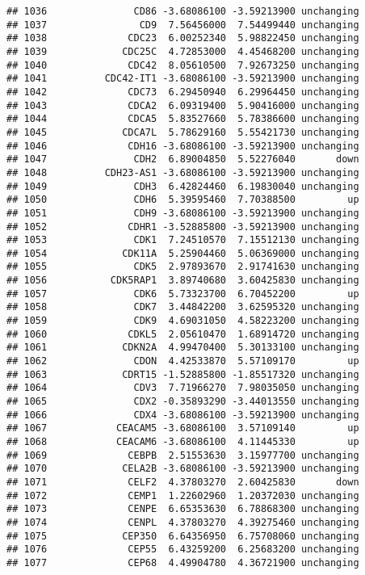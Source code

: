 \documentclass[]{article}
\begin{document}
\begin{verbatim}
## 1036               CD86 -3.68086100 -3.59213900 unchanging
## 1037                CD9  7.56456000  7.54499440 unchanging
## 1038              CDC23  6.00252340  5.98822450 unchanging
## 1039             CDC25C  4.72853000  4.45468200 unchanging
## 1040              CDC42  8.05610500  7.92673250 unchanging
## 1041          CDC42-IT1 -3.68086100 -3.59213900 unchanging
## 1042              CDC73  6.29450940  6.29964450 unchanging
## 1043              CDCA2  6.09319400  5.90416000 unchanging
## 1044              CDCA5  5.83527660  5.78386600 unchanging
## 1045             CDCA7L  5.78629160  5.55421730 unchanging
## 1046              CDH16 -3.68086100 -3.59213900 unchanging
## 1047               CDH2  6.89004850  5.52276040       down
## 1048          CDH23-AS1 -3.68086100 -3.59213900 unchanging
## 1049               CDH3  6.42824460  6.19830040 unchanging
## 1050               CDH6  5.39595460  7.70388500         up
## 1051               CDH9 -3.68086100 -3.59213900 unchanging
## 1052              CDHR1 -3.52885800 -3.59213900 unchanging
## 1053               CDK1  7.24510570  7.15512130 unchanging
## 1054             CDK11A  5.25904460  5.06369000 unchanging
## 1055               CDK5  2.97893670  2.91741630 unchanging
## 1056           CDK5RAP1  3.89740680  3.60425830 unchanging
## 1057               CDK6  5.73323700  6.70452200         up
## 1058               CDK7  3.44842200  3.62595320 unchanging
## 1059               CDK9  4.69031050  4.58223200 unchanging
## 1060              CDKL5  2.05610470  1.68914720 unchanging
## 1061             CDKN2A  4.99470400  5.30133100 unchanging
## 1062               CDON  4.42533870  5.57109170         up
## 1063             CDRT15 -1.52885800 -1.85517320 unchanging
## 1064               CDV3  7.71966270  7.98035050 unchanging
## 1065               CDX2 -0.35893290 -3.44013550 unchanging
## 1066               CDX4 -3.68086100 -3.59213900 unchanging
## 1067            CEACAM5 -3.68086100  3.57109140         up
## 1068            CEACAM6 -3.68086100  4.11445330         up
## 1069              CEBPB  2.51553630  3.15977700 unchanging
## 1070             CELA2B -3.68086100 -3.59213900 unchanging
## 1071              CELF2  4.37803270  2.60425830       down
## 1072              CEMP1  1.22602960  1.20372030 unchanging
## 1073              CENPE  6.65353630  6.78868300 unchanging
## 1074              CENPL  4.37803270  4.39275460 unchanging
## 1075             CEP350  6.64356950  6.75708060 unchanging
## 1076              CEP55  6.43259200  6.25683200 unchanging
## 1077              CEP68  4.49904780  4.36721900 unchanging

\end{verbatim}
\end{document}
